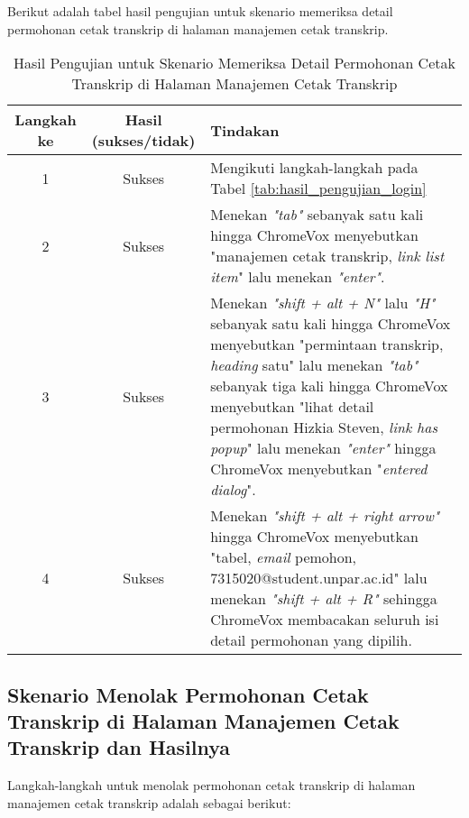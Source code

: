 Berikut adalah tabel hasil pengujian untuk skenario memeriksa detail permohonan cetak transkrip di halaman manajemen cetak transkrip.

\begin{table}[H]
    \centering 
    \caption{Hasil Pengujian untuk Skenario Memeriksa Detail Permohonan Cetak Transkrip di Halaman Manajemen Cetak Transkrip}
    \label{tab:hasil_pengujian_memeriksa_detail_permohonan_cetak_transkrip_di_halaman_manajemen_cetak_transkrip}
    \begin{tabular}{|c|c|p{10cm}|}
        \toprule
        Langkah ke & Hasil (sukses/tidak) & Tindakan \\

        \midrule
        1 & Sukses & Mengikuti langkah-langkah pada Tabel \ref{tab:hasil_pengujian_login} \\
        2 & Sukses & Menekan \textit{"tab"} sebanyak satu kali hingga ChromeVox menyebutkan "manajemen cetak transkrip, \textit{link list item}" lalu menekan \textit{"enter"}. \\
        3 & Sukses & Menekan \textit{"shift + alt + N"} lalu \textit{"H"} sebanyak satu kali hingga ChromeVox menyebutkan "permintaan transkrip, \textit{heading} satu" lalu menekan \textit{"tab"} sebanyak tiga kali hingga ChromeVox menyebutkan "lihat detail permohonan Hizkia Steven, \textit{link has popup}" lalu menekan \textit{"enter"} hingga ChromeVox menyebutkan "\textit{entered dialog}". \\
        4 & Sukses & Menekan \textit{"shift + alt + right arrow"} hingga ChromeVox menyebutkan "tabel, \textit{email} pemohon, 7315020@student.unpar.ac.id" lalu menekan \textit{"shift + alt + R"} sehingga ChromeVox membacakan seluruh isi detail permohonan yang dipilih. \\

        \bottomrule

    \end{tabular}
\end{table}

\subsection{Skenario Menolak Permohonan Cetak Transkrip di Halaman Manajemen Cetak Transkrip dan Hasilnya}
\label{subsec:skenario_menolak_permohonan_cetak_transkrip_di_halaman_manajemen_cetak_transkrip}
Langkah-langkah untuk menolak permohonan cetak transkrip di halaman manajemen cetak transkrip adalah sebagai berikut:

